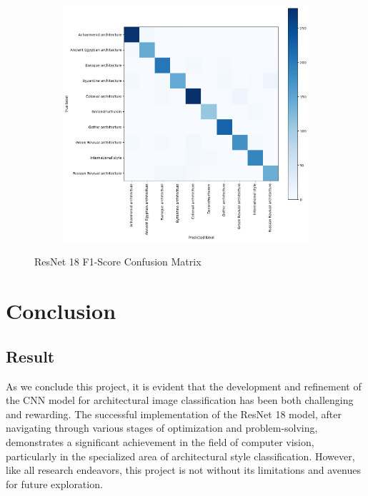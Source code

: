 \documentclass{article}
\begin{document}
\begin{figure}[h]
    \centering

    \begin{subfigure}{0.5\linewidth}
        \includegraphics[width=\linewidth]{images/confusion-matrix.jpg}
    \end{subfigure}%

    \caption{ResNet 18 F1-Score Confusion Matrix}
    \label{fig:confusion_matrix}
\end{figure}

\section{Conclusion}

\subsection{Result}

As we conclude this project, it is evident that the development and refinement of the CNN model for architectural image classification has been both challenging and rewarding. The successful implementation of the ResNet 18 model, after navigating through various stages of optimization and problem-solving, demonstrates a significant achievement in the field of computer vision, particularly in the specialized area of architectural style classification. However, like all research endeavors, this project is not without its limitations and avenues for future exploration.
\end{document}
